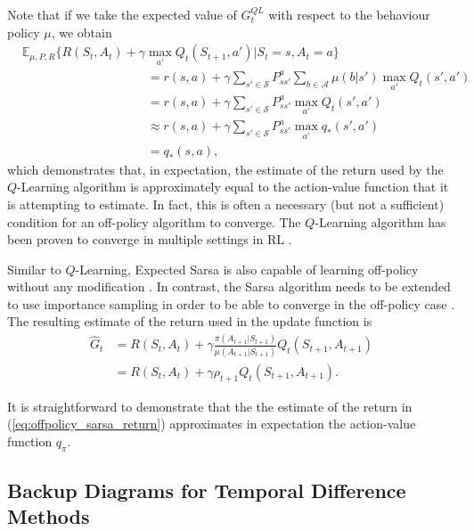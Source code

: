 Note that if we take the expected value of $G^{QL}_t$ with respect to the behaviour policy $\mu$, we obtain
\begin{align*}
& \mathbb{E}_{\mu,P,R} \{ R(S_t,A_t) + \gamma \max_{a'} Q_t(S_{t+1}, a') | S_t = s, A_t = a \}
	\nonumber \\
%
& \hspace{120pt} = r(s, a) + \gamma \sum_{s' \in \mathcal{S}} P^a_{ss'} 
	\sum_{b \in \mathcal{A}} \mu(b|s') \max_{a'} Q_t(s',a')
	\nonumber \\
%
& \hspace{120pt} = r(s, a) + \gamma \sum_{s' \in \mathcal{S}} P^a_{ss'} \max_{a'} Q_t(s',a')
	\nonumber \\
%
& \hspace{120pt} \approx r(s,a) + \gamma \sum_{s' \in \mathcal{S}} P^a_{ss'} \max_{a'} q_*(s',a')
	\nonumber \\
%
& \hspace{120pt} = q_*(s,a),
\end{align*}
which demonstrates that, in expectation, the estimate of the return used by the $Q$-Learning algorithm is approximately equal to the action-value function that it is attempting to estimate.
In fact, this is often a necessary (but not a sufficient) condition for an off-policy algorithm to converge.
The $Q$-Learning algorithm has been proven to converge in multiple settings in RL \parencite{watkins1992,Tsitsiklis1994, Jaakkola:1994:CSI:1362288.1362296}.

Similar to $Q$-Learning, Expected Sarsa is also capable of learning off-policy without any modification \parencite{precup2000}.
In contrast, the Sarsa algorithm needs to be extended to use importance sampling in order to be able to converge in the off-policy case \parencite{precup2000}. 
The resulting estimate of the return used in the update function is
\begin{align}
\label{eq:offpolicy_sarsa_return}
\hat{G}_t &= R(S_t,A_t) + \gamma \frac{\pi(A_{t+1}|S_{t+1})}{\mu(A_{t+1}|S_{t+1})} 
    Q_t(S_{t+1}, A_{t+1}) \nonumber \\
%
&= R(S_t, A_t) + \gamma \rho_{t+1} Q_t(S_{t+1}, A_{t+1}).
\end{align}

It is straightforward to demonstrate that the the estimate of the return in (\ref{eq:offpolicy_sarsa_return}) approximates in expectation the action-value function $q_\pi$.

\subsection{Backup Diagrams for Temporal Difference Methods}

